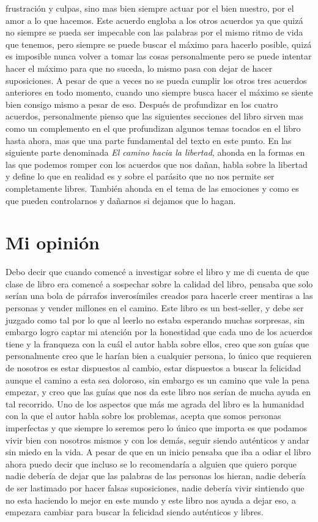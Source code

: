 \documentclass[a4paper,12pt]{article}
\begin{document}
frustración y culpas, sino mas bien siempre actuar por el bien nuestro, por el amor a lo que
hacemos. Este acuerdo engloba a los otros acuerdos ya que quizá no siempre se pueda ser impecable
con las palabras por el mismo ritmo de vida que tenemos, pero siempre se puede buscar el máximo
para hacerlo posible, quizá es imposible nunca volver a tomar las cosas personalmente pero se puede
intentar hacer el máximo para que no suceda, lo mismo pasa con dejar de hacer suposiciones. A
pesar de que a veces no se pueda cumplir los otros tres acuerdos anteriores en todo momento, cuando uno siempre
busca hacer el máximo se siente bien consigo mismo a pesar de eso.
Después de profundizar en los cuatro acuerdos, personalmente pienso que las siguientes secciones
del libro sirven mas como un complemento en el que profundizan algunos temas tocados en el libro
hasta ahora, mas que una parte fundamental del texto en este punto. En las siguiente parte
denominada \textit{El camino hacia la libertad}, ahonda en la formas en las que podemos romper con
los acuerdos que nos dañan, habla sobre la libertad y define lo que en realidad es y
sobre el parásito que no nos permite ser completamente libres. También ahonda en el tema de las
emociones y como es que pueden controlarnos y dañarnos si dejamos que lo hagan.
\section*{Mi opinión}
Debo decir que cuando comencé a investigar sobre el libro y me di cuenta de que clase de libro era comencé a
sospechar sobre la calidad del libro, pensaba que solo serían una bola de párrafos inverosímiles
creados para hacerle creer mentiras a las personas y vender millones en el camino. Este libro es
un best-seller, y debe ser juzgado como tal por lo que al leerlo no estaba esperando muchas
sorpresas, sin embargo logro captar mi
atención por la honestidad que cada uno de los acuerdos
tiene y la franqueza con la cuál el autor habla sobre ellos, creo que son guías que personalmente
creo que le harían bien a cualquier persona, lo único que requieren de nosotros es estar dispuestos
al cambio, estar dispuestos a buscar la felicidad aunque el camino a esta sea doloroso, sin embargo
es un camino que vale la pena empezar, y creo que las guías que nos da este libro nos serían de
mucha ayuda en tal recorrido. 
Uno de los aspectos que más me agrada del libro es la humanidad con la que el autor
habla sobre los problemas, acepta que somos personas imperfectas y que siempre lo seremos pero lo
único que importa es que podamos vivir bien con nosotros mismos y con los demás, seguir siendo
auténticos y andar sin miedo en la vida. 
A pesar de que en un inicio pensaba que iba a odiar el libro ahora puedo decir que incluso se lo
recomendaría a alguien que quiero porque nadie debería de dejar que las palabras de las
personas los hieran, nadie debería de ser lastimado por hacer falsas suposiciones, nadie debería vivir sintiendo
que no esta haciendo lo mejor en este mundo y este libro nos ayuda a dejar eso, a empezara cambiar
para buscar la felicidad siendo auténticos y libres.
\end{document}
